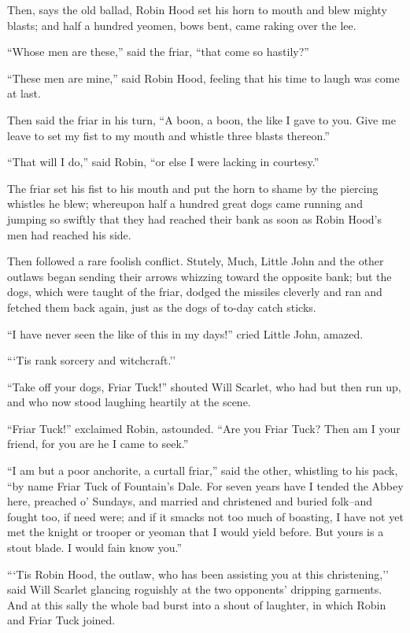 Then, says the old ballad, Robin Hood set his horn to mouth and blew
mighty blasts; and half a hundred yeomen, bows bent, came raking over
the lee.

``Whose men are these,'' said the friar, ``that come so hastily?''

``These men are mine,'' said Robin Hood, feeling that his time to laugh
was come at last.

Then said the friar in his turn, ``A boon, a boon, the like I gave to
you. Give me leave to set my fist to my mouth and whistle three blasts
thereon.''

``That will I do,'' said Robin, ``or else I were lacking in courtesy.''

The friar set his fist to his mouth and put the horn to shame by the
piercing whistles he blew; whereupon half a hundred great dogs came
running and jumping so swiftly that they had reached their bank as soon
as Robin Hood's men had reached his side.

Then followed a rare foolish conflict. Stutely, Much, Little John and
the other outlaws began sending their arrows whizzing toward the
opposite bank; but the dogs, which were taught of the friar, dodged the
missiles cleverly and ran and fetched them back again, just as the dogs
of to-day catch sticks.

``I have never seen the like of this in my days!'' cried Little John,
amazed.

```Tis rank sorcery and witchcraft.''

``Take off your dogs, Friar Tuck!'' shouted Will Scarlet, who had but
then run up, and who now stood laughing heartily at the scene.

``Friar Tuck!'' exclaimed Robin, astounded. ``Are you Friar Tuck? Then
am I your friend, for you are he I came to seek.''

``I am but a poor anchorite, a curtall friar,'' said the other,
whistling to his pack, ``by name Friar Tuck of Fountain's Dale. For
seven years have I tended the Abbey here, preached o' Sundays, and
married and christened and buried folk--and fought too, if need were;
and if it smacks not too much of boasting, I have not yet met the knight
or trooper or yeoman that I would yield before. But yours is a stout
blade. I would fain know you.''

```Tis Robin Hood, the outlaw, who has been assisting you at this
christening,'' said Will Scarlet glancing roguishly at the two
opponents' dripping garments. And at this sally the whole bad burst into
a shout of laughter, in which Robin and Friar Tuck joined.

